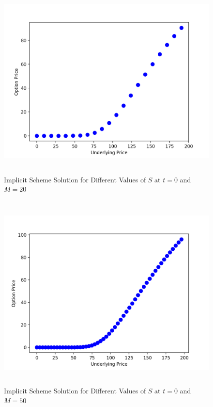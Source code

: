 \documentclass[12pt]{report}
\begin{document}
\begin{figure}[H]
	\centering
	\includegraphics[height=10cm,width=13cm]{Implicit_20}
	\caption{Implicit Scheme Solution for Different Values of $S$ at $t= 0$ and $M= 20$}
\end{figure}

\begin{figure}[H]
	\centering
	\includegraphics[height=10cm,width=13cm]{Implicit_50}
	\caption{Implicit Scheme Solution for Different Values of $S$ at $t= 0$ and $M= 50$}
\end{figure}
\end{document}
